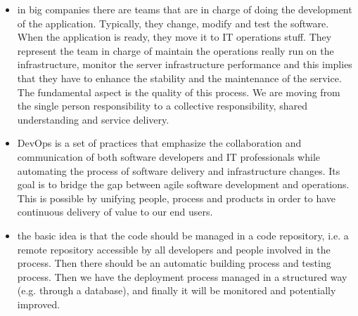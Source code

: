 \begin{itemize}
    \item in big companies there are teams that are in charge of doing the development of the application. Typically, they change, modify and test the software. When the application is ready, they move it to IT operations stuff. They represent the team in charge of maintain the operations really run on the infrastructure, monitor the server infrastructure performance and this implies that they have to enhance the stability and the maintenance of the service. The fundamental aspect is the quality of this process. We are moving from the single person responsibility to a collective responsibility, shared understanding and service delivery.
    \item DevOps is a set of practices that emphasize the collaboration and communication of both software developers and IT professionals while automating the process of software delivery and infrastructure changes. Its goal is to bridge the gap between agile software development and operations. This is possible by unifying people, process and products in order to have continuous delivery of value to our end users.
    \item the basic idea is that the code should be managed in a code repository, i.e. a remote repository accessible by all developers and people involved in the process. Then there should be an automatic building process and testing process. Then we have the deployment process managed in a structured way (e.g. through a database), and finally it will be monitored and potentially improved.
\end{itemize}
